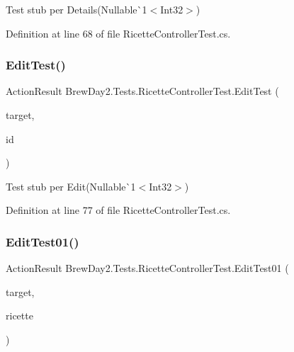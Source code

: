 Test stub per Details(Nullable\`{}1$<$Int32$>$)



Definition at line 68 of file Ricette\+Controller\+Test.\+cs.

\mbox{\label{class_brew_day2_1_1_tests_1_1_ricette_controller_test_a811ad94e3440cb5745a9b0ed6eba89cf}} 
\subsubsection{\texorpdfstring{Edit\+Test()}{EditTest()}}
{\footnotesize\ttfamily Action\+Result Brew\+Day2.\+Tests.\+Ricette\+Controller\+Test.\+Edit\+Test (\begin{DoxyParamCaption}\item[{\mbox{[}\+Pex\+Assume\+Under\+Test\mbox{]} \mbox{\hyperlink{class_brew_day2_1_1_controllers_1_1_ricette_controller}{Ricette\+Controller}}}]{target,  }\item[{int?}]{id }\end{DoxyParamCaption})}



Test stub per Edit(Nullable\`{}1$<$Int32$>$)



Definition at line 77 of file Ricette\+Controller\+Test.\+cs.

\mbox{\label{class_brew_day2_1_1_tests_1_1_ricette_controller_test_a5e7713a8b37b5151d7b68e8d96599794}} 
\subsubsection{\texorpdfstring{Edit\+Test01()}{EditTest01()}}
{\footnotesize\ttfamily Action\+Result Brew\+Day2.\+Tests.\+Ricette\+Controller\+Test.\+Edit\+Test01 (\begin{DoxyParamCaption}\item[{\mbox{[}\+Pex\+Assume\+Under\+Test\mbox{]} \mbox{\hyperlink{class_brew_day2_1_1_controllers_1_1_ricette_controller}{Ricette\+Controller}}}]{target,  }\item[{\mbox{\hyperlink{class_brew_day2_1_1_models_1_1_ricette}{Ricette}}}]{ricette }\end{DoxyParamCaption})}



